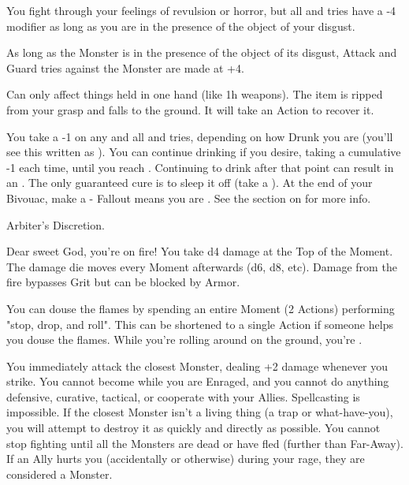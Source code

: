 \begin{multicols*}{2}

  You fight through your feelings of revulsion or horror, but all \RO and \RB tries have a -4 modifier as long as you are in the presence of the object of your disgust.

   As long as the Monster is in the presence of the object of its disgust, Attack and Guard tries against the Monster are made at +4.


  Can only affect things held in one hand (like 1h weapons). The item is ripped from your grasp and falls to the ground.  It will take an Action to recover it.

  
  You take a -1 on any and all \RO and \RB tries, depending on how Drunk you are (you'll see this written as ).  You can continue drinking if you desire, taking a cumulative -1 each time, until you reach . Continuing to drink after that point can result in an .  The only guaranteed cure is to sleep it off (take a ).  At the end of your Bivouac, make a \RSTRY{\VIG} - Fallout means you are . See the section on  for more info. 

    Arbiter's Discretion.


  Dear sweet God, you're on fire! You take d4 damage at the Top of the Moment. The damage die moves \DCUP every Moment afterwards (d6, d8, etc). Damage from the fire bypasses Grit but can be blocked by Armor.

You can douse the flames by spending an entire Moment (2 Actions) performing "stop, drop, and roll".  This can be shortened to a single Action if someone helps you douse the flames. While you're rolling around on the ground, you're .



  You immediately attack the closest Monster, dealing +2 damage whenever you strike. You cannot become  while you are Enraged, and you cannot do anything defensive, curative, tactical, or cooperate with your Allies. Spellcasting is impossible. If the closest Monster isn't a living thing (a trap or what-have-you), you will attempt to destroy it as quickly and directly as possible. You cannot stop fighting until all the Monsters are dead or have fled (further than Far-Away).  If an Ally hurts you (accidentally or otherwise) during your rage, they are considered a Monster.


\end{multicols*}
